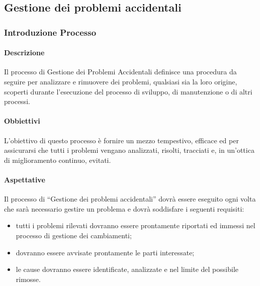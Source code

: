 	\subsection{Gestione dei problemi accidentali}
		\subsubsection{Introduzione Processo}
			\paragraph{Descrizione}
				Il processo di Gestione dei Problemi Accidentali definisce una procedura da seguire per analizzare e rimuovere dei problemi, qualsiasi sia la loro origine, scoperti durante l'esecuzione del processo di sviluppo, di manutenzione o di altri processi.
			\paragraph{Obbiettivi}
				L'obiettivo di questo processo è fornire un mezzo tempestivo, efficace ed per assicurarsi che tutti i problemi vengano analizzati, risolti, tracciati e, in un'ottica di miglioramento continuo, evitati.
			\paragraph{Aspettative}
			Il processo di “Gestione dei problemi accidentali” dovrà essere eseguito ogni volta che sarà necessario gestire un problema e dovrà soddisfare i seguenti requisiti: 
			\begin{itemize}
				\item tutti i problemi rilevati dovranno essere prontamente riportati ed immessi nel processo di gestione dei cambiamenti;
				\item dovranno essere avvisate prontamente le parti interessate;
				\item le cause dovranno essere identificate, analizzate e nel limite del possibile rimosse.
			\end{itemize}
